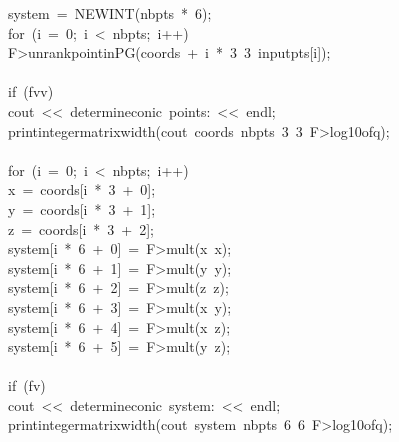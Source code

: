 \begin{tabbing}
\>system\ =\ NEWINT(nbpts\ *\ 6);\\[0pt]
\>for\ (i\ =\ 0;\ i\ <\ nbpts;\ i++)\ \\[0pt]
\>\>F>unrankpointinPG(coords\ +\ i\ *\ 3\ 3\ inputpts[i]);\\[0pt]
\>\>\\[0pt]
\>if\ (fvv)\ \\[0pt]
\>\>cout\ <<\ determineconic\ points:\ <<\ endl;\\[0pt]
\>\>printintegermatrixwidth(cout\ coords\ nbpts\ 3\ 3\ F>log10ofq);\\[0pt]
\>\>\\[0pt]
\>for\ (i\ =\ 0;\ i\ <\ nbpts;\ i++)\ \\[0pt]
\>\>x\ =\ coords[i\ *\ 3\ +\ 0];\\[0pt]
\>\>y\ =\ coords[i\ *\ 3\ +\ 1];\\[0pt]
\>\>z\ =\ coords[i\ *\ 3\ +\ 2];\\[0pt]
\>\>system[i\ *\ 6\ +\ 0]\ =\ F>mult(x\ x);\\[0pt]
\>\>system[i\ *\ 6\ +\ 1]\ =\ F>mult(y\ y);\\[0pt]
\>\>system[i\ *\ 6\ +\ 2]\ =\ F>mult(z\ z);\\[0pt]
\>\>system[i\ *\ 6\ +\ 3]\ =\ F>mult(x\ y);\\[0pt]
\>\>system[i\ *\ 6\ +\ 4]\ =\ F>mult(x\ z);\\[0pt]
\>\>system[i\ *\ 6\ +\ 5]\ =\ F>mult(y\ z);\\[0pt]
\>\>\\[0pt]
\>if\ (fv)\ \\[0pt]
\>\>cout\ <<\ determineconic\ system:\ <<\ endl;\\[0pt]
\>\>printintegermatrixwidth(cout\ system\ nbpts\ 6\ 6\ F>log10ofq);\\[0pt]
\>\>\\[0pt]
\\[0pt]

\end{tabbing}
